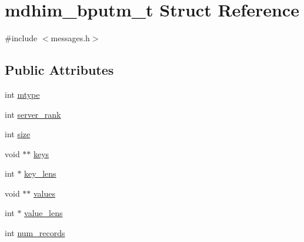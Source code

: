 \hypertarget{structmdhim__bputm__t}{\section{mdhim\-\_\-bputm\-\_\-t Struct Reference}
\label{structmdhim__bputm__t}
}


{\ttfamily \#include $<$messages.\-h$>$}

\subsection*{Public Attributes}
\begin{DoxyCompactItemize}
\item 
int \hyperlink{structmdhim__bputm__t_a84865663becc6cfd06c5c7667b37244d}{mtype}
\item 
int \hyperlink{structmdhim__bputm__t_afd28a1e8797725473429ebed5ccc6800}{server\-\_\-rank}
\item 
int \hyperlink{structmdhim__bputm__t_a480571293980863083cce4de0287a9c3}{size}
\item 
void $\ast$$\ast$ \hyperlink{structmdhim__bputm__t_a6cd17a8565bb662fdb1d52d878ce2a3d}{keys}
\item 
int $\ast$ \hyperlink{structmdhim__bputm__t_a528ae69dc41eab9b8e8d523d67debeac}{key\-\_\-lens}
\item 
void $\ast$$\ast$ \hyperlink{structmdhim__bputm__t_a1b908d082b136370db7574dc25d44853}{values}
\item 
int $\ast$ \hyperlink{structmdhim__bputm__t_a915478fbead386af153b4b3989ff7fb6}{value\-\_\-lens}
\item 
int \hyperlink{structmdhim__bputm__t_ad075b00254b3f26231b57134995d017b}{num\-\_\-records}
\end{DoxyCompactItemize}


